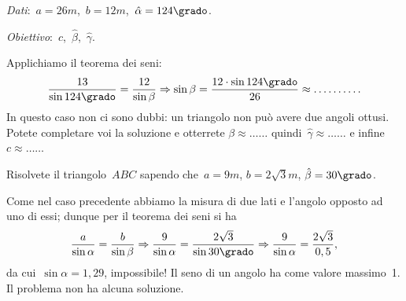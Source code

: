 \emph{Dati}:~$a= 26\unit{m}$,\quad~$b= 
12\unit{m}$,\quad~${\hat{\alpha}}=124\grado$.

\emph{Obiettivo}:~$c$,\quad~$\hat{\beta}$,\quad~$\hat{\gamma}$.

Applichiamo il teorema dei seni:
\[\frac{13}{\sin 124\grado}=\frac{12}{\sin \beta}\Rightarrow \sin 
\beta=\frac{12\cdot\sin 124\grado}{26}\approx\ldots \ldots \ldots.\]
In questo caso non ci sono dubbi: un triangolo non può avere due angoli ottusi. 
Potete completare voi la soluzione e otterrete
${\beta}{\approx}\ldots\ldots$ quindi~${\hat{\gamma}}{\approx} \ldots\ldots$ e 
infine~$c{\approx}\ldots\ldots$

\begin{problema}
Risolvete il triangolo~$ABC$ sapendo che~$a= 9\unit{m}$, $b=2 \sqrt 3\unit{m}$, 
${\hat{\beta}}=30\grado$.
\end{problema}
Come nel caso precedente abbiamo la misura di due lati e l'angolo opposto ad uno 
di essi; dunque per il teorema dei seni si ha
\[\frac{a}{\sin \alpha}=\frac{b}{\sin \beta} \Rightarrow \frac{9}{\sin 
\alpha}=\frac{2\sqrt{3}}{\sin 30\grado} \Rightarrow \frac{9}{\sin 
\alpha}=\frac{2\sqrt{3}}{0,5},\]
da cui~$\sin  \alpha=1,29$, impossibile! Il seno di un angolo ha come valore 
massimo~1.
Il problema non ha alcuna soluzione.

